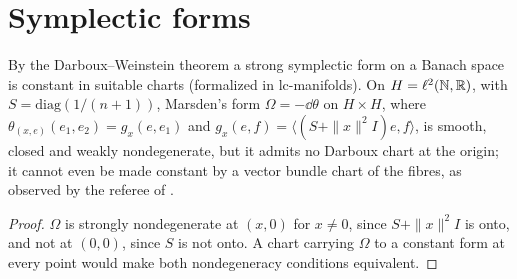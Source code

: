 \section{Symplectic forms}

\begin{example}
  \label{ex:ce-darboux}
  \leanok
  By the Darboux--Weinstein theorem a strong symplectic form on a Banach space is constant in
  suitable charts \cite{Wei69} (formalized in lc-manifolds). On $H = \ell^2(\mathbb{N}, \mathbb{R})$, with
  $S = \mathrm{diag}(1/(n+1))$, Marsden's form $\Omega = -\dd\theta$ on $H \times H$, where
  $\theta_{(x, e)}(e_1, e_2) = g_x(e, e_1)$ and $g_x(e, f) = \langle (S + \|x\|^2 I) e, f\rangle$,
  is smooth, closed and weakly nondegenerate, but it admits no Darboux chart at the origin; it
  cannot even be made constant by a vector bundle chart of the fibres, as observed by the referee
  of \cite{Mar72}.
\end{example}

\begin{proof}
  \leanok
  $\Omega$ is strongly nondegenerate at $(x, 0)$ for $x \neq 0$, since $S + \|x\|^2 I$ is onto,
  and not at $(0, 0)$, since $S$ is not onto. A chart carrying $\Omega$ to a constant form at every
  point would make both nondegeneracy conditions equivalent.
\end{proof}
